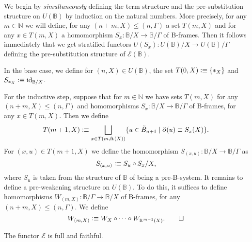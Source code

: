 \begin{constr}
We begin by \emph{simultaneously} defining the term structure and the pre-substitution
structure on $U(\mathbb{B})$ by induction on the natural numbers. More precisely,
for any $m\in\mathbb{N}$ we will define, for any $(n+m,X)\leq (n,\Gamma)$ a set
$T(m,X)$ and for any $x\in T(m,X)$ a homomorphism 
$S_x:\mathbb{B}/X\to\mathbb{B}/\Gamma$ of B-frames. Then it follows
immediately that we get stratified functors $U(S_x):U(\mathbb{B})/X\to U(\mathbb{B})/\Gamma$
defining the pre-substitution structure of $\mathcal{E}(\mathbb{B})$.

In the base case, we define for $(n,X)\in U(\mathbb{B})$, the set
$T(0,X)\defeq \{\pt[X]\}$ and $S_{\pt[X]}\defeq \catid{\mathbb{B}/X}$. 


For the inductive step, suppose that for $m\in\mathbb{N}$ we have sets $T(m,X)$
for any $(n+m,X)\leq (n,\Gamma)$ and homomorphisms $S_x:\mathbb{B}/X \to \mathbb{B}/\Gamma$
of B-frames, for any $x\in T(m,X)$. Then we define
\begin{equation*}
T(m+1,X)\vcentcolon\equiv\bigsqcup_{x\in T(m,\mathrm{ft}_{}(X))} \{u\in \tilde{B}_{n+1}\mid \partial_{}(u)\equiv S_x(X)\}.
\end{equation*}
For $(x,u)\in T(m+1,X)$ we define the homomorphism $S_{(x,u)}:\mathbb{B}/X\to
\mathbb{B}/\Gamma$ as
\begin{equation*}
S_{(x,u)}\vcentcolon\equiv S_u\circ S_x/X,
\end{equation*}
where $S_u$ is taken from the structure of $\mathbb{B}$ of being a pre-B-system.
It remains to define a pre-weakening structure on $U(\mathbb{B})$. To do this,
it suffices to define homomorphisms $W_{(m,X)}:\mathbb{B}/\Gamma \to\mathbb{B}/X$
of B-frames, for any $(n+m,X)\leq (n,\Gamma)$. We define
\begin{equation*}
W_{(m,X)}\vcentcolon\equiv W_X\circ\cdots\circ W_{\mathrm{ft}_{}^{m-1}(X)}.\qedhere
\end{equation*}
\end{constr}

\begin{thm}
The functor $\mathcal{E}$ is full and faithful.
\end{thm}

